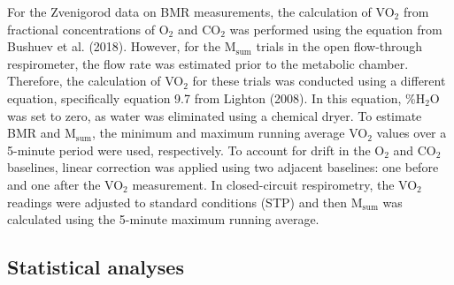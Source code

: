 \documentclass[10pt, twoside]{book} %
\begin{document}
For the Zvenigorod data on BMR measurements, the calculation of VO$_{\text{2}}$ from fractional concentrations of O$_{\text{2}}$ and CO$_{\text{2}}$ was performed using the equation from Bushuev et al. (2018). However, for the M$_{\text{sum}}$ trials in the open flow-through respirometer, the flow rate was estimated prior to the metabolic chamber. Therefore, the calculation of VO$_{\text{2}}$ for these trials was conducted using a different equation, specifically equation 9.7 from Lighton (2008). In this equation, \%H$_{\text{2}}$O was set to zero, as water was eliminated using a chemical dryer. To estimate BMR and M$_{\text{sum}}$, the minimum and maximum running average VO$_{\text{2}}$ values over a 5-minute period were used, respectively. To account for drift in the O$_{\text{2}}$ and CO$_{\text{2}}$ baselines, linear correction was applied using two adjacent baselines: one before and one after the VO$_{\text{2}}$ measurement. In closed-circuit respirometry, the VO$_{\text{2}}$ readings were adjusted to standard conditions (STP) and then M$_{\text{sum}}$ was calculated using the 5-minute maximum running average.\\

\subsection{Statistical analyses}
\end{document}
